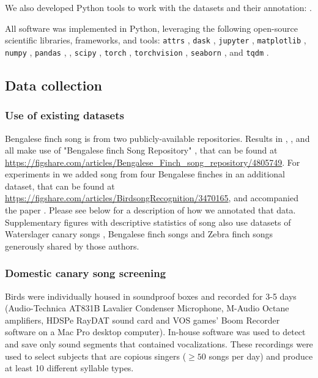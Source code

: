 \documentclass[9pt,lineno]{elife}
\begin{document}
We also developed Python tools to work with the datasets and their annotation:  
\citep{Nicholson_crowsetta_2021, david_nicholson_2021_4584209, david_nicholson_2021_4584210}.

All software was implemented in Python, 
leveraging the following open-source scientific libraries, frameworks, and tools:
\texttt{attrs} \citep{attrs}, 
\texttt{dask} \citep{dask_development_team_dask_2016}, 
\texttt{jupyter} \citep{kluyver2016jupyter},
\texttt{matplotlib} \citep{Hunter:2007,thomas_a_caswell_2020_4030140}, 
\texttt{numpy} \citep{walt_numpy_2011, harris2020array}, 
\texttt{pandas} \citep{team_pandas-devpandas_2020}, 
 \citep{scikit-learn,griselScikitlearnScikitlearnScikitlearn2020}, 
\texttt{scipy} \citep{virtanen_scipy_2020}, 
\texttt{torch} \citep{paszke_automatic_2017}, 
\texttt{torchvision} \citep{marcel_torchvision_2010}, 
\texttt{seaborn} \citep{michael_waskom_2020_4019146,Waskom2021}, 
and \texttt{tqdm} \citep{casper_da_costa_luis_2020_4054194}.

\subsection{Data collection}
\subsubsection{Use of existing datasets}
Bengalese finch song is from two publicly-available repositories. 
Results in , , 
and  all make use of 
"Bengalese finch Song Repository" \citep{nicholson_bengalese_2017}, that can be found at
\url{https://figshare.com/articles/Bengalese_Finch_song_repository/4805749}.
For experiments in  
we added song from four Bengalese finches in an additional dataset, 
\citep{koumura_birdsongrecognition_2016} that can be found at 
\url{https://figshare.com/articles/BirdsongRecognition/3470165}, and accompanied the paper \citep{koumura_automatic_2016-1}.
Please see  below for a description of how we annotated that data. 
Supplementary figures with descriptive statistics of song also use 
datasets of Waterslager canary songs \citep{markowitz_long-range_2013}, 
Bengalese finch songs \citep{koumura_automatic_2016-1} and Zebra finch songs \citep{otchy_acute_2015} 
generously shared by those authors.

\subsubsection{Domestic canary song screening}
Birds were individually housed in soundproof boxes and recorded for 3-5 days (Audio-Technica AT831B Lavalier Condenser Microphone, M-Audio Octane amplifiers, HDSPe RayDAT sound card and VOS games’ Boom Recorder software on a Mac Pro desktop computer). In-house software was used to detect and save only sound segments that contained vocalizations. These recordings were used to select subjects that are copious singers ($\ge 50$ songs per day) and produce at least 10 different syllable types.
\end{document}
